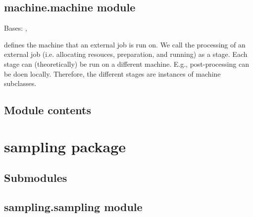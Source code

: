 \documentclass[letterpaper,10pt,english]{sphinxmanual}
\begin{document}
\section{machine.machine module}
\label{\detokenize{machine:module-machine.machine}}\label{\detokenize{machine:machine-machine-module}}

\begin{fulllineitems}
\label{\detokenize{machine:machine.machine.Machine}}
Bases: {\hyperref[\detokenize{simulation:simulation.simulation.Stage}]{}}, {\hyperref[\detokenize{helpers:helpers.baseclass.BaseClass}]{}}

defines the machine that an external job is run on. 
We call the processing of an external job (i.e. allocating 
resouces, preparation, and running) as a stage. 
Each stage can (theoretically) be run on a different machine.
E.g., post-processing can be doen locally.
Therefore, the different stages are instances of machine 
subclasses.

\end{fulllineitems}



\section{Module contents}
\label{\detokenize{machine:module-machine}}\label{\detokenize{machine:module-contents}}

\chapter{sampling package}
\label{\detokenize{sampling:sampling-package}}\label{\detokenize{sampling::doc}}

\section{Submodules}
\label{\detokenize{sampling:submodules}}

\section{sampling.sampling module}
\label{\detokenize{sampling:module-sampling.sampling}}\label{\detokenize{sampling:sampling-sampling-module}}
\end{document}
